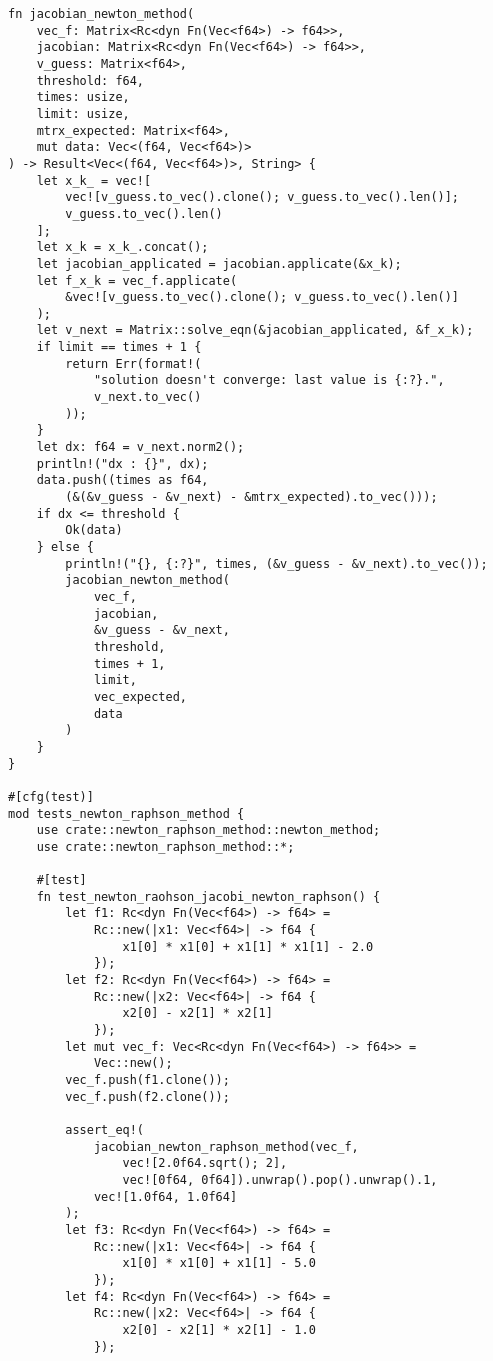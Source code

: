 \documentclass[uplatex, 11pt,a4j, titlepage]{jsarticle}
\begin{document}
\begin{lstlisting}[caption={newton\_raphson\_method.rs}]
fn jacobian_newton_method(
    vec_f: Matrix<Rc<dyn Fn(Vec<f64>) -> f64>>,
    jacobian: Matrix<Rc<dyn Fn(Vec<f64>) -> f64>>,
    v_guess: Matrix<f64>,
    threshold: f64,
    times: usize,
    limit: usize,
    mtrx_expected: Matrix<f64>,
    mut data: Vec<(f64, Vec<f64>)>
) -> Result<Vec<(f64, Vec<f64>)>, String> {
    let x_k_ = vec![
        vec![v_guess.to_vec().clone(); v_guess.to_vec().len()]; 
        v_guess.to_vec().len()
    ];
    let x_k = x_k_.concat();
    let jacobian_applicated = jacobian.applicate(&x_k);
    let f_x_k = vec_f.applicate(
        &vec![v_guess.to_vec().clone(); v_guess.to_vec().len()]
    );
    let v_next = Matrix::solve_eqn(&jacobian_applicated, &f_x_k);
    if limit == times + 1 {
        return Err(format!(
            "solution doesn't converge: last value is {:?}.",
            v_next.to_vec()
        ));
    }
    let dx: f64 = v_next.norm2();
    println!("dx : {}", dx);
    data.push((times as f64, 
        (&(&v_guess - &v_next) - &mtrx_expected).to_vec()));
    if dx <= threshold {
        Ok(data)
    } else {
        println!("{}, {:?}", times, (&v_guess - &v_next).to_vec());
        jacobian_newton_method(
            vec_f,
            jacobian,
            &v_guess - &v_next,
            threshold,
            times + 1,
            limit,
            vec_expected,
            data
        )
    }
}
    
#[cfg(test)]
mod tests_newton_raphson_method {
    use crate::newton_raphson_method::newton_method;
    use crate::newton_raphson_method::*;
    
    #[test]
    fn test_newton_raohson_jacobi_newton_raphson() {
        let f1: Rc<dyn Fn(Vec<f64>) -> f64> =
            Rc::new(|x1: Vec<f64>| -> f64 { 
                x1[0] * x1[0] + x1[1] * x1[1] - 2.0 
            });
        let f2: Rc<dyn Fn(Vec<f64>) -> f64> =
            Rc::new(|x2: Vec<f64>| -> f64 { 
                x2[0] - x2[1] * x2[1] 
            });
        let mut vec_f: Vec<Rc<dyn Fn(Vec<f64>) -> f64>> = 
            Vec::new();
        vec_f.push(f1.clone());
        vec_f.push(f2.clone());

        assert_eq!(
            jacobian_newton_raphson_method(vec_f, 
                vec![2.0f64.sqrt(); 2], 
                vec![0f64, 0f64]).unwrap().pop().unwrap().1,
            vec![1.0f64, 1.0f64]
        );
        let f3: Rc<dyn Fn(Vec<f64>) -> f64> =
            Rc::new(|x1: Vec<f64>| -> f64 { 
                x1[0] * x1[0] + x1[1] - 5.0 
            });
        let f4: Rc<dyn Fn(Vec<f64>) -> f64> =
            Rc::new(|x2: Vec<f64>| -> f64 { 
                x2[0] - x2[1] * x2[1] - 1.0 
            });


\end{lstlisting}
\end{document}
